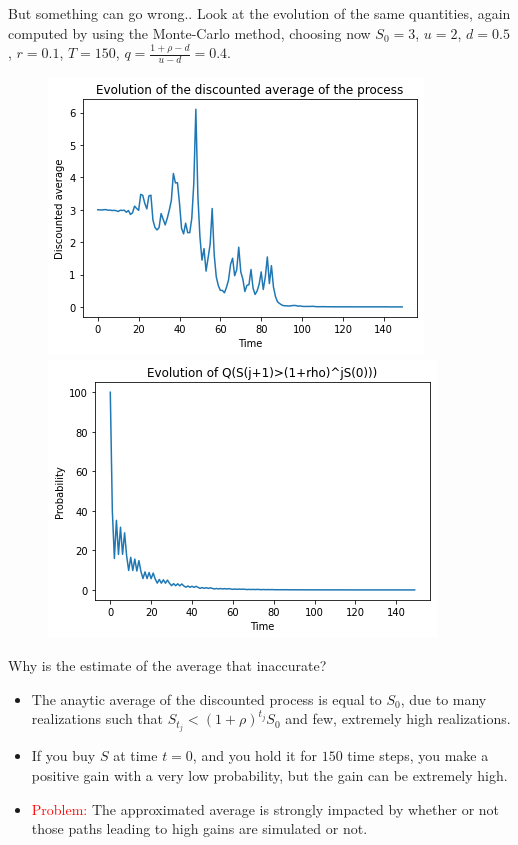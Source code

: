 \documentclass[9 pt]{beamer} %
\def \red {\textcolor{red}}
\begin{document}
\begin{frame}{But something can go wrong..}
Look at the evolution of the same quantities, again computed by using the Monte-Carlo method, choosing now $S_0=3$, $u=2$, $d=0.5$, $r=0.1$, $T=150$, $q=\frac{1+\rho-d}{u-d}=0.4$.
 \begin{figure}
\centering
\begin{minipage}[b]{.5\textwidth}
  \centering
 \includegraphics[scale=0.4]{Averaged05u2r01.png}
\end{minipage}%
\begin{minipage}[b]{.5\textwidth}
  \centering
 \includegraphics[scale=0.4]{Probabilityu2d05.png}
\end{minipage}
\end{figure}
\end{frame}


\begin{frame}{Why is the estimate of the average that inaccurate?}
\begin{itemize}
\item The anaytic average of the discounted process is equal to $S_0$, due to many realizations such that $S_{t_j}<(1+\rho)^{t_j}S_0$ and few, extremely high realizations. 
\item If you buy $S$ at time $t=0$, and you hold it for $150$ time steps, you make a positive gain with a very low probability, but the gain can be extremely high.
\item  \red{Problem:} The approximated average is strongly impacted by whether or not those paths leading to high gains are simulated or not.
\end{itemize}
\end{frame}
\end{document}

